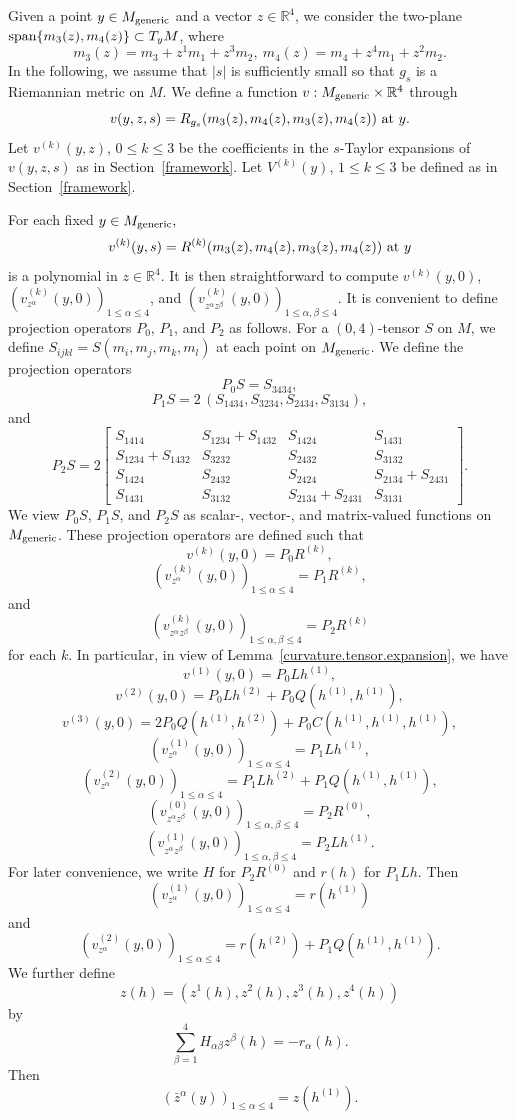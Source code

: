 \documentclass[11pt]{amsart}
\theoremstyle{definition}
\begin{document}
Given a point $y \in M_{\text{\rm generic}}$ and a vector $z \in \mathbb{R}^4$, we consider the two-plane $\text{\rm span}\{m_3(z),m_4(z)\} \subset T_y M$, where 
\[ m_3(z)=m_3+z^1 m_1+z^3 m_2,\ m_4(z)=m_4+z^4 m_1+z^2 m_2. \] 
In the following, we assume that $|s|$ is sufficiently small so that $g_s$ is a Riemannian metric on $M$. We define a function $v:M_{\text{\rm generic}}\times\mathbb{R}^4$ through
\[v(y,z,s)= R_{g_s}(m_3(z),m_4(z),m_3(z),m_4(z))\ \textup{at}\ y.\]
Let $v^{(k)}(y,z)$, $0\leq k\leq 3$ be the coefficients in the $s$-Taylor expansions of $v(y,z,s)$ as in Section~\ref{framework}.
Let $V^{(k)}(y)$, $1\leq k\leq 3$ be defined as in Section~\ref{framework}.

For each fixed $y \in M_{\text{\rm generic}},$ 
\[v^{(k)}(y,s)=R^{(k)}(m_3(z),m_4(z),m_3(z),m_4(z))\ \textup{at }y\]
is a polynomial in $z\in\mathbb{R}^4$.
It is then straightforward to compute $v^{(k)}(y,0)$, $(v^{(k)}_{z^\alpha}(y,0))_{1\leq \alpha\leq 4}$, and $(v^{(k)}_{z^\alpha z^\beta}(y,0))_{1\leq \alpha,\beta\leq 4}$. 
It is convenient to define projection operators $P_0$, $P_1$, and $P_2$ as follows.
For a $(0,4)$-tensor $S$ on $M$, we define $S_{ijkl}=S(m_i,m_j,m_k,m_l)$ at each point on $M_{\text{\rm generic}}$. We define the projection operators
$$P_0S=S_{3434},$$
$$ P_1S= 2 \, (S_{1434},S_{3234},S_{2434},S_{3134}), $$
and
\[P_2S = 2 \begin{bmatrix} S_{1414} & S_{1234}+S_{1432} & S_{1424} & S_{1431}\\
S_{1234}+S_{1432} & S_{3232} & S_{2432} & S_{3132}\\
S_{1424} & S_{2432} & S_{2424} & S_{2134}+S_{2431}\\
S_{1431} & S_{3132} & S_{2134}+S_{2431} & S_{3131} \end{bmatrix}.\]
We view $P_0S$, $P_1S$, and $P_2S$ as scalar-, vector-, and matrix-valued functions on $M_{\text{\rm generic}}$. These projection operators are defined such that
\[v^{(k)}(y,0)=P_0R^{(k)},\]
\[(v^{(k)}_{z^\alpha}(y,0))_{1\leq \alpha\leq 4}=P_1R^{(k)},\]
and
\[(v^{(k)}_{z^\alpha z^\beta}(y,0))_{1\leq \alpha,\beta\leq 4}=P_2R^{(k)}\]
for each $k$. In particular, in view of Lemma~\ref{curvature.tensor.expansion}, we have
\[v^{(1)}(y,0)=P_0Lh^{(1)},\] 
\[v^{(2)}(y,0)=P_0Lh^{(2)}+P_0Q(h^{(1)},h^{(1)}),\] 
\[v^{(3)}(y,0)=2P_0Q(h^{(1)},h^{(2)})+P_0C(h^{(1)},h^{(1)},h^{(1)}),\]
\[(v^{(1)}_{z^\alpha}(y,0))_{1\leq \alpha\leq 4}=P_1Lh^{(1)},\]
\[ (v^{(2)}_{z^\alpha}(y,0))_{1\leq \alpha\leq 4}=P_1Lh^{(2)}+P_1Q(h^{(1)},h^{(1)}), \]
\[ (v^{(0)}_{z^\alpha z^\beta}(y,0))_{1\leq \alpha,\beta\leq 4}=P_2R^{(0)}, \]
\[ (v^{(1)}_{z^\alpha z^\beta}(y,0))_{1\leq \alpha,\beta\leq 4}=P_2Lh^{(1)}. \] 
For later convenience, we write $H$ for $P_2R^{(0)}$ and $r(h)$ for $P_1Lh$.
Then
\[(v^{(1)}_{z^\alpha}(y,0))_{1\leq \alpha\leq 4}=r(h^{(1)})\] 
and
\[ (v^{(2)}_{z^\alpha}(y,0))_{1\leq \alpha\leq 4}=r(h^{(2)})+P_1Q(h^{(1)},h^{(1)}).\]
We further define 
\[z(h)=(z^1(h),z^2(h),z^3(h),z^4(h)) \]
by
\[ \sum_{\beta=1}^4 H_{\alpha\beta}z^\beta(h)=-r_\alpha(h). \]
Then
\[(\bar{z}^{\alpha}(y))_{1\leq \alpha\leq 4}=z(h^{(1)}).\]
\end{document}
